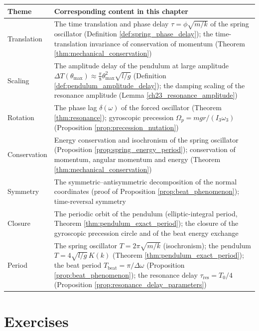 \begin{center}
\begin{tabular}{>{\centering\arraybackslash}p{2.8cm}>{\centering\arraybackslash}p{9.9cm}}
\toprule
Theme & Corresponding content in this chapter \\
\midrule
Translation & The time translation and phase delay $\tau = \phi\sqrt{m/k}$ of the spring oscillator (Definition \ref{def:spring_phase_delay}); the time-translation invariance of conservation of momentum (Theorem \ref{thm:mechanical_conservation}) \\
Scaling & The amplitude delay of the pendulum at large amplitude $\Delta T(\theta_{\max}) \approx \frac{\pi}{8}\theta_{\max}^2\sqrt{l/g}$ (Definition \ref{def:pendulum_amplitude_delay}); the damping scaling of the resonance amplitude (Lemma \ref{ch23_resonance_amplitude}) \\
Rotation & The phase lag $\delta(\omega)$ of the forced oscillator (Theorem \ref{thm:resonance}); gyroscopic precession $\Omega_p = mgr/(I_3\omega_3)$ (Proposition \ref{prop:precession_nutation}) \\
Conservation & Energy conservation and isochronism of the spring oscillator (Proposition \ref{prop:spring_energy_period}); conservation of momentum, angular momentum and energy (Theorem \ref{thm:mechanical_conservation}) \\
Symmetry & The symmetric--antisymmetric decomposition of the normal coordinates (proof of Proposition \ref{prop:beat_phenomenon}); time-reversal symmetry \\
Closure & The periodic orbit of the pendulum (elliptic-integral period, Theorem \ref{thm:pendulum_exact_period}); the closure of the gyroscopic precession circle and of the beat energy exchange \\
Period & The spring oscillator $T = 2\pi\sqrt{m/k}$ (isochronism); the pendulum $T = 4\sqrt{l/g}\,K(k)$ (Theorem \ref{thm:pendulum_exact_period}); the beat period $T_{\text{beat}} = \pi/\Delta\omega$ (Proposition \ref{prop:beat_phenomenon}); the resonance delay $\tau_{\text{res}} = T_0/4$ (Proposition \ref{prop:resonance_delay_parameters}) \\
\bottomrule
\end{tabular}
\end{center}

\section*{Exercises}

